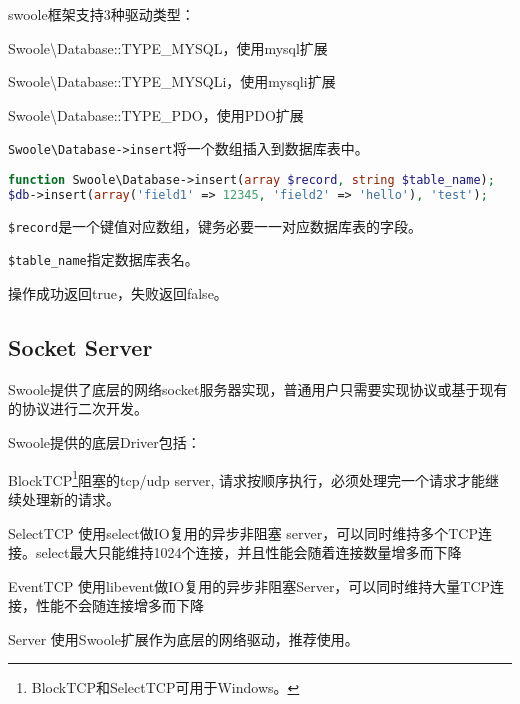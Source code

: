 swoole框架支持3种驱动类型：

\begin{compactenum}
\item Swoole\textbackslash Database::TYPE\_MYSQL，使用mysql扩展
\item Swoole\textbackslash Database::TYPE\_MYSQLi，使用mysqli扩展
\item Swoole\textbackslash Database::TYPE\_PDO，使用PDO扩展
\end{compactenum}

\texttt{Swoole\textbackslash Database->insert}将一个数组插入到数据库表中。


\begin{lstlisting}[language=PHP]
function Swoole\Database->insert(array $record, string $table_name);
$db->insert(array('field1' => 12345, 'field2' => 'hello'), 'test');
\end{lstlisting}

\begin{compactitem}
\item \texttt{\$record}是一个键值对应数组，键务必要一一对应数据库表的字段。
\item \texttt{\$table\_name}指定数据库表名。
\item 操作成功返回true，失败返回false。
\end{compactitem}




\subsection{Socket Server}

Swoole提供了底层的网络socket服务器实现，普通用户只需要实现协议或基于现有的协议进行二次开发。

Swoole提供的底层Driver包括：

\begin{compactitem}
\item BlockTCP\footnote{BlockTCP和SelectTCP可用于Windows。}阻塞的tcp/udp server, 请求按顺序执行，必须处理完一个请求才能继续处理新的请求。
\item SelectTCP 使用select做IO复用的异步非阻塞 server，可以同时维持多个TCP连接。select最大只能维持1024个连接，并且性能会随着连接数量增多而下降
\item EventTCP 使用libevent做IO复用的异步非阻塞Server，可以同时维持大量TCP连接，性能不会随连接增多而下降
\item Server 使用Swoole扩展作为底层的网络驱动，推荐使用。
\end{compactitem}



